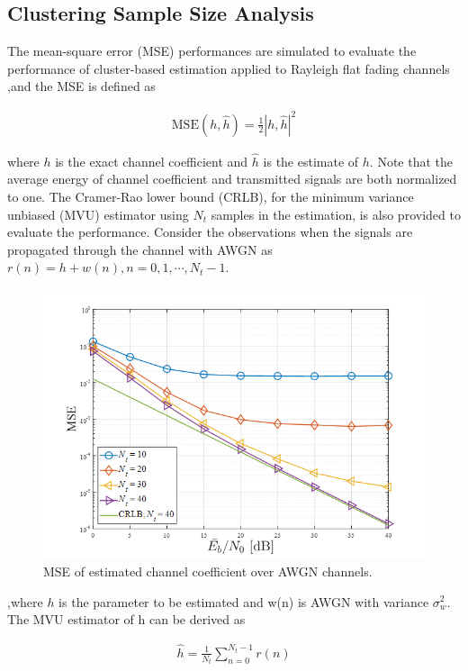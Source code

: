 \subsection{Clustering Sample Size Analysis}

The mean-square error (MSE) performances are simulated to evaluate the performance of cluster-based estimation applied to Rayleigh flat fading channels ,and the MSE is defined as

\begin{align}
\text{MSE}(h,\hat{h})=\frac{1}{2} | h,\hat{h} |^2  
\end{align}

where $h$ is the exact channel coefficient and $\hat{h}$ is the estimate of $h$. Note that the average energy of channel coefficient and transmitted signals are both normalized to one. The Cramer-Rao lower bound (CRLB), for the minimum variance unbiased (MVU) estimator using $N_t$ samples in the estimation, is also provided to evaluate the performance. Consider the observations when the signals are propagated through the channel with AWGN as
$r(n)=h+w(n),n=0,1,\cdots,N_t-1$.

\begin{figure}[b!]
 \centering
 \includegraphics[width=15cm]{fig/sample_size_analysis1.png}
 \caption{MSE of estimated channel coefficient over AWGN channels.}
 \label{fig:sample_size_analysis1}
\end{figure}

,where $h$ is the parameter to be estimated and w(n) is AWGN with variance $\sigma_w^2$. The MVU estimator of h can be derived as 

\begin{align}
\hat{h} = \frac{1}{N_t} \sum_{n=0}^{N_t-1}r(n)  
\end{align}

